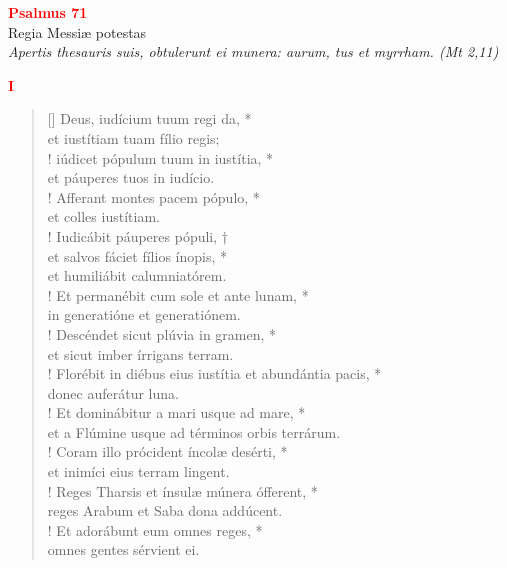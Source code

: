 


\def\greinitialformat#1{%
{\fontsize{39}{39}\selectfont #1}%
}




\vspace{0.3cm}
\begin{center}
 \textcolor{red}{\large \bf Psalmus 71}\\
Regia Messiæ potestas\\
\textit{\small Apertis thesauris suis, obtulerunt ei munera: aurum, tus et myrrham. (Mt 2,11)}
\end{center}
\begin{center}
\textcolor{red}{\bf I}
\end{center}
\begin{verse}[\versewidth]
Deus, iudícium tuum regi da, *\\
et iustítiam tuam fílio regis;\\!
\vin iúdicet pópulum tuum in iustítia, *\\
\vin et páuperes tuos in iudício.\\!
Afferant montes pacem pópulo, *\\
et colles iustítiam.\\!
\vin Iudicábit páuperes pópuli, †\\
\vin et salvos fáciet fílios ínopis, *\\
\vin et humiliábit calumniatórem.\\!
Et permanébit cum sole et ante lunam, *\\
in generatióne et generatiónem.\\!
\vin Descéndet sicut plúvia in gramen, *\\
\vin et sicut imber írrigans terram.\\!
Florébit in diébus eius iustítia et abundántia pacis, *\\
donec auferátur luna.\\!
\vin Et dominábitur a mari usque ad mare, *\\
\vin et a Flúmine usque ad términos orbis terrárum.\\!
Coram illo prócident íncolæ desérti, *\\
et inimíci eius terram lingent.\\!
\vin Reges Tharsis et ínsulæ múnera ófferent, *\\
\vin reges Arabum et Saba dona addúcent.\\!
Et adorábunt eum omnes reges, *\\
omnes gentes sérvient ei.\\
\end{verse}
